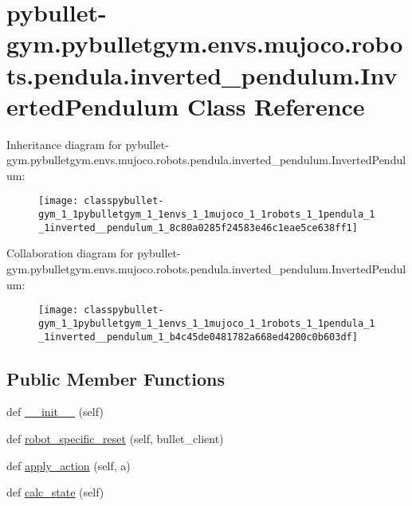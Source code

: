 \hypertarget{classpybullet-gym_1_1pybulletgym_1_1envs_1_1mujoco_1_1robots_1_1pendula_1_1inverted__pendulum_1_1_inverted_pendulum}{}\section{pybullet-\/gym.pybulletgym.\+envs.\+mujoco.\+robots.\+pendula.\+inverted\+\_\+pendulum.\+Inverted\+Pendulum Class Reference}
\label{classpybullet-gym_1_1pybulletgym_1_1envs_1_1mujoco_1_1robots_1_1pendula_1_1inverted__pendulum_1_1_inverted_pendulum}


Inheritance diagram for pybullet-\/gym.pybulletgym.\+envs.\+mujoco.\+robots.\+pendula.\+inverted\+\_\+pendulum.\+Inverted\+Pendulum\+:
\nopagebreak
\begin{figure}[H]
\begin{center}
\leavevmode
\texttt{[image: classpybullet-gym\_1\_1pybulletgym\_1\_1envs\_1\_1mujoco\_1\_1robots\_1\_1pendula\_1\_1inverted\_\_pendulum\_1\_8c80a0285f24583e46c1eae5ce638ff1]}
\end{center}
\end{figure}


Collaboration diagram for pybullet-\/gym.pybulletgym.\+envs.\+mujoco.\+robots.\+pendula.\+inverted\+\_\+pendulum.\+Inverted\+Pendulum\+:
\nopagebreak
\begin{figure}[H]
\begin{center}
\leavevmode
\texttt{[image: classpybullet-gym\_1\_1pybulletgym\_1\_1envs\_1\_1mujoco\_1\_1robots\_1\_1pendula\_1\_1inverted\_\_pendulum\_1\_b4c45de0481782a668ed4200c0b603df]}
\end{center}
\end{figure}
\subsection*{Public Member Functions}
\begin{DoxyCompactItemize}
\item 
def \hyperlink{classpybullet-gym_1_1pybulletgym_1_1envs_1_1mujoco_1_1robots_1_1pendula_1_1inverted__pendulum_1_1_inverted_pendulum_a2ac572cd30ed1c3ed01e62ef025e1856}{\+\_\+\+\_\+init\+\_\+\+\_\+} (self)
\item 
def \hyperlink{classpybullet-gym_1_1pybulletgym_1_1envs_1_1mujoco_1_1robots_1_1pendula_1_1inverted__pendulum_1_1_inverted_pendulum_a8148428ffc79eeb8a1dcf0f8e2150158}{robot\+\_\+specific\+\_\+reset} (self, bullet\+\_\+client)
\item 
def \hyperlink{classpybullet-gym_1_1pybulletgym_1_1envs_1_1mujoco_1_1robots_1_1pendula_1_1inverted__pendulum_1_1_inverted_pendulum_ab278f07a016c290400bd4e264657a8d3}{apply\+\_\+action} (self, a)
\item 
def \hyperlink{classpybullet-gym_1_1pybulletgym_1_1envs_1_1mujoco_1_1robots_1_1pendula_1_1inverted__pendulum_1_1_inverted_pendulum_a2d3ca638722f1e8206936609271c5f43}{calc\+\_\+state} (self)
\end{DoxyCompactItemize}
